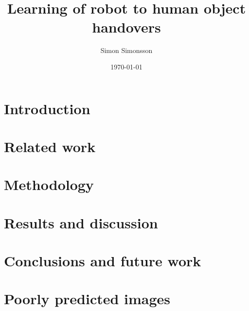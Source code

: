\documentclass{kththesis}
\title{Learning of robot to human object handovers}
\author{Simon Simonsson}
\date{\today}
\begin{document}
\frontmatter %
\titlepage

\begin{abstract}
	
\end{abstract}

\begin{otherlanguage}{swedish}
	\begin{abstract}
		
	\end{abstract}
\end{otherlanguage}

\tableofcontents

\mainmatter %

\chapter{Introduction}


\chapter{Related work}


\chapter{Methodology}


\chapter{Results and discussion}


\chapter{Conclusions and future work}


\printbibliography[heading=bibintoc] %

\appendix
\chapter{Poorly predicted images}

\end{document}
